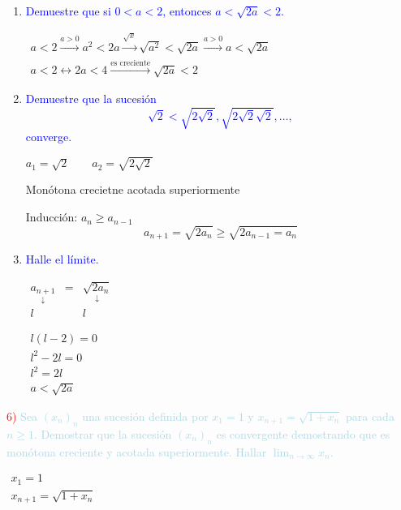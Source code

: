 \begin{enumerate}[label=\color{red}\alph*), leftmargin=*]
	\item \textcolor{blue}{ Demuestre que si $0<a<2$, entonces $a<\sqrt{2a}<2$.}
	
	$\begin{array}{l}
		a<2\xrightarrow{a>0}a^2<2a\xrightarrow{\sqrt{x}}\sqrt{a^2}<\sqrt{2a}\xrightarrow{a>0}a<\sqrt{2a}\\
		a<2\longleftrightarrow 2a<4\xrightarrow{\text{es creciente}}\sqrt{2a}<2
	\end{array}$
	
	\item \textcolor{blue}{Demuestre que la sucesión \[ \sqrt{2}<\sqrt{2\sqrt{2}},\sqrt{2\sqrt{2}\sqrt{2}},\hdots, \] converge.}
	
	$a_1=\sqrt{2}\qquad a_ 2=\sqrt{2\sqrt{2}}$
	
	 Monótona crecietne acotada superiormente
	
	Inducción: $a_n\ge a_{n-1}$ \[ a_{n+1}=\sqrt{2a_n}\ge \sqrt{2a_{n-1}=a_n} \]
	\item \textcolor{blue}{Halle el límite.}
	
	$\begin{array}{ccc}
		\underset{\downarrow}{a_{n+1}} & = & \underset{\downarrow}{\sqrt{2a_n}}\\
		l & & l
	\end{array}$
	
	$\begin{array}{l}
		l(l-2)=0\\
		l^2-2l=0\\
		l^2=2l\\
		a<\sqrt{2a}
	\end{array}$
\end{enumerate}

\textcolor{red}{6) }\textcolor{lightblue}{Sea $(x_n)_n$ una sucesión definida por $x_1=1$ y $x_{n+1}=\sqrt{1+x_n}$ para cada $n\ge1$. Demostrar que la sucesión $(x_n)_n$ es convergente demostrando que es monótona creciente y acotada superiormente. Hallar $\lim_{n\to\infty}x_n$.}

$\begin{array}{l}
	x_1=1\\
	x_{n+1}=\sqrt{1+x_n}
\end{array}$

